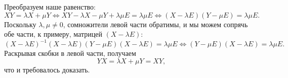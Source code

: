 \documentclass{article}
\begin{document}
Преобразуем наше равенство:
$$XY = \lambda X + \mu Y \iff XY - \lambda X - \mu Y + \lambda \mu E = \lambda \mu E \iff (X - \lambda E)(Y - \mu E) = \lambda \mu E.$$
Поскольку $\lambda, \mu \neq 0$, сомножители левой части обратимы, и мы можем сопрячь обе части, к примеру, матрицей $(X - \lambda E)$:
$$(X - \lambda E)^{-1} (X - \lambda E) (Y - \mu E) (X - \lambda E) = \lambda \mu E \iff (Y - \mu E)(X - \lambda E) = \lambda \mu E.$$
Раскрывая скобки в левой части, получаем
$$YX = \lambda X + \mu Y = XY,$$
что и требовалось доказать.
\end{document}
